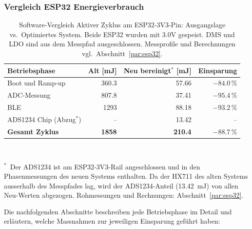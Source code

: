 \documentclass[12pt,a4paper]{article}
\begin{document}
	\subsubsection{Vergleich ESP32 Energieverbrauch}
	\begin{table}[H]
	\centering
	\caption{Software-Vergleich Aktiver Zyklus am ESP32-3V3-Pin: Ausgangslage vs.\ Optimiertes System. Beide ESP32 wurden mit 3.0V gespeist. DMS und LDO sind aus dem Messpfad ausgeschlossen.
	Messprofile und Berechnungen vgl.\ Abschnitt~\ref{par:esp32}.}
	\label{tab:sw-vergleich}
	\begin{tabular}{@{}lrrr@{}}
		\toprule
		Betriebsphase                 & Alt [mJ]       & Neu bereinigt$^{*}$ [mJ] & Einsparung \\
		\midrule
		Boot und Ramp-up              & 360.3          & 57.66                    & $-84.0\,\%$ \\
		ADC-Messung                   & 807.8          & 37.41                    & $-95.4\,\%$ \\
		BLE                           & 1293           & 88.18                    & $-93.2\,\%$ \\
		ADS1234 Chip (Abzug$^{*}$)    & --             & 13.42                    & -- \\
		\midrule
		\textbf{Gesamt Zyklus}        & \textbf{1858}  & \textbf{210.4}           & $\mathbf{-88.7\,\%}$ \\
		\bottomrule
	\end{tabular}
	\\[6pt]
	\begin{minipage}{0.95\linewidth}
		\footnotesize $^{*}$~Der ADS1234 ist am ESP32-3V3-Rail angeschlossen und in den Phasenmessungen des
		neuen Systems enthalten. Da der HX711 des alten Systems ausserhalb des Messpfades lag, wird der
		ADS1234-Anteil (\SI{13.42}{\milli\joule}) von allen Neu-Werten abgezogen.
		Rohmessungen und Rechnungen: Abschnitt~\ref{par:esp32}.
	\end{minipage}
	\end{table}

	Die nachfolgenden Abschnitte beschreiben jede Betriebsphase im Detail und erläutern, welche Massnahmen zur jeweiligen Einsparung geführt haben:
\end{document}
